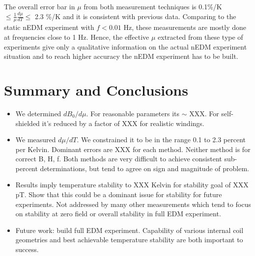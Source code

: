 \documentclass[review]{elsarticle}
\begin{document}
 The overall error bar in $\mu$ from both measurement techniques is 0.1\%/K $\leq \frac{1}{\mu}\frac{d\mu}{dT} \leq$ 2.3 \%/K and it is consistent with previous data.
Comparing to the static nEDM experiment with $f < 0.01$ Hz, these measurements are mostly done at frequencies close to 1 Hz. Hence, the effective $\mu$ extracted from these type of experiments give
only a qualitative information on the actual nEDM experiment situation and to reach higher accuracy the nEDM experiment has to be built. 
\section{Summary and Conclusions}

\begin{itemize}
\item We determined $dB_0/d\mu$.  For reasonable parameters its $\sim$ XXX.  For self-shielded it's reduced by a factor of XXX for realistic windings.
\item We measured $d\mu/dT$.  We constrained it to be in the range 0.1
  to 2.3 percent per Kelvin.  Dominant errors are XXX for each method.
  Neither method is for correct B, H, f.  Both methods are very
  difficult to achieve consistent sub-percent determinations, but tend
  to agree on sign and magnitude of problem.
\item Results imply temperature stability to XXX Kelvin for stability
  goal of XXX pT.  Show that this could be a dominant issue for
  stability for future experiments.  Not addressed by many other
  measurements which tend to focus on stability at zero field or
  overall stability in full EDM experiment.
\item Future work: build full EDM experiment.  Capability of various
  internal coil geometries and best achievable temperature stability
  are both important to success.
\end{itemize}


\end{document}
